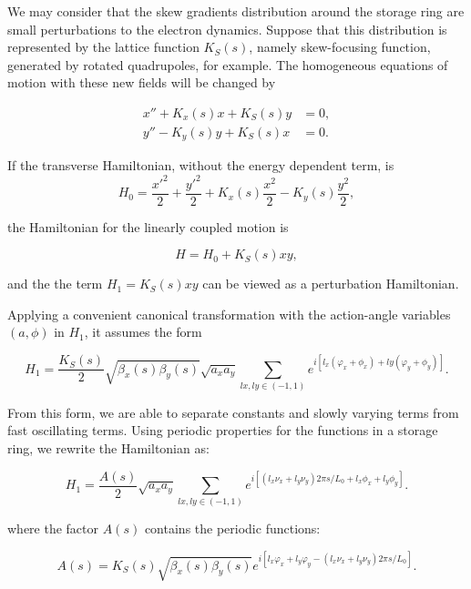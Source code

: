 We may consider that the skew gradients distribution around the storage ring are small perturbations to the electron dynamics. Suppose that this distribution is represented by the lattice function $K_S(s)$, namely skew-focusing function, generated by rotated quadrupoles, for example. The homogeneous equations of motion with these new fields will be changed by

\begin{align}
    x'' + K_x(s) x + K_S(s)y &=0, \\
    y'' - K_y(s) y + K_S(s)x &=0.
\end{align}

If the transverse Hamiltonian, without the energy dependent term, is 
\begin{equation*}
H_0 = \dfrac{{x'}^2}{2} + \dfrac{{y'}^2}{2} + K_x(s)\dfrac{{x}^2}{2} - K_y(s) \frac{y^2}{2},    
\end{equation*}

the Hamiltonian for the linearly coupled motion is 

\begin{equation*}
    H = H_0 + K_S(s) xy,
\end{equation*}

and the the term $H_1 = K_S(s) xy$ can be viewed as a perturbation Hamiltonian.

Applying a convenient canonical transformation with the action-angle variables $(a, \phi)$ in $H_1$, it assumes the form

\begin{equation*}
    H_1 = \dfrac{K_S(s)}{2}\sqrt{\beta_x(s)\beta_y(s)} \sqrt{a_x a_y} \sum_{lx, ly \in (-1, 1)} e^{i\left[l_x(\varphi_x + \phi_x) + ly(\varphi_y + \phi_y)\right]}.
\end{equation*}

From this form, we are able to separate constants and slowly varying terms from fast oscillating terms. Using periodic properties for the functions in a storage ring, we rewrite the Hamiltonian as:

\begin{equation*}
    H_1 = \dfrac{A(s)}{2} \sqrt{a_x a_y} \sum_{lx, ly \in (-1, 1)} e^{i\left[\left(l_x\nu_x + l_y\nu_y\right)2\pi s/L_0 + l_x\phi_x + l_y\phi_y\right]}.
\end{equation*}

where the factor $A(s)$ contains the periodic functions:

\begin{equation*}
    A(s) = K_S(s) \sqrt{\beta_x(s) \beta_y(s)} e^{i\left[l_x\varphi_x + l_y\varphi_y - \left(l_x\nu_x + l_y\nu_y\right)2\pi s/L_0\right]}.
\end{equation*}

